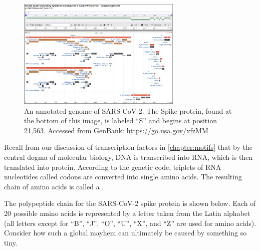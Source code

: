 \begin{figure}[h]
	\centering
	\mySfFamily
	\includegraphics[width = 0.7\textwidth]{../images/SARSCoV2Annotation.png}
	\caption{An annotated genome of SARS-CoV-2. The Spike protein, found at the bottom of this image, is labeled ``S'' and begins at position 21,563. Accessed from GenBank: \url{https://go.usa.gov/xfzMM}}
	\label{fig:SARSCoV2Annotation}
\end{figure}

Recall from our discussion of transcription factors in \autoref{chapter:motifs} that by the central dogma of molecular biology, DNA is transcribed into RNA, which is then translated into protein. According to the genetic code, triplets of RNA nucleotides called codons are converted into single amino acids. The resulting chain of amino acids is called a .

The polypeptide chain for the SARS-CoV-2 spike protein is shown below. Each of 20 possible amino acids is represented by a letter taken from the Latin alphabet (all letters except for ``B'', ``J'', ``O'', ``U'', ``X'', and ``Z'' are used for amino acids). Consider how such a global mayhem can ultimately be caused by something so tiny.


